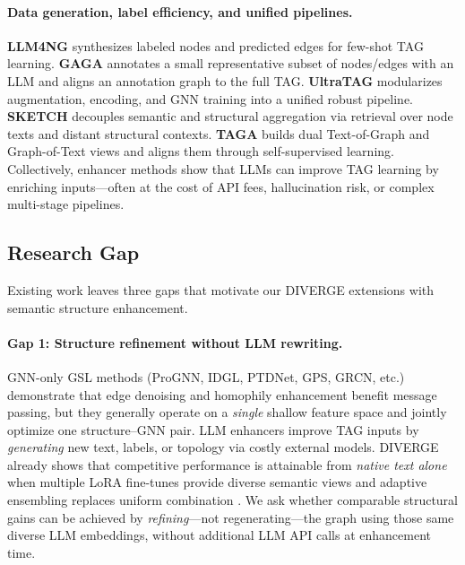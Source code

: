 \documentclass{article}
\begin{document}
\paragraph{Data generation, label efficiency, and unified pipelines.}
\textbf{LLM4NG} \citep{Yu2025NodeGenerationTAG} synthesizes labeled nodes and predicted
edges for few-shot TAG learning. \textbf{GAGA} \citep{hu2025gaga} annotates a small
representative subset of nodes/edges with an LLM and aligns an annotation graph to the
full TAG. \textbf{UltraTAG} \citep{yu2025ultratag} modularizes augmentation, encoding,
and GNN training into a unified robust pipeline. \textbf{SKETCH} \citep{zhou-etal-2025sketch}
decouples semantic and structural aggregation via retrieval over node texts and distant
structural contexts. \textbf{TAGA} \citep{zhang2025taga} builds dual Text-of-Graph and
Graph-of-Text views and aligns them through self-supervised learning. Collectively,
enhancer methods show that LLMs can improve TAG learning by enriching inputs---often
at the cost of API fees, hallucination risk, or complex multi-stage pipelines.


\subsection{Research Gap}
\label{sec:research-gap}

Existing work leaves three gaps that motivate our DIVERGE extensions with semantic
structure enhancement.

\paragraph{Gap 1: Structure refinement without LLM rewriting.}
GNN-only GSL methods (ProGNN, IDGL, PTDNet, GPS, GRCN, etc.) demonstrate that edge
denoising and homophily enhancement benefit message passing, but they generally operate
on a \emph{single} shallow feature space and jointly optimize one structure--GNN pair.
LLM enhancers improve TAG inputs by \emph{generating} new text, labels, or topology
via costly external models. DIVERGE already shows that competitive performance is
attainable from \emph{native text alone} when multiple LoRA fine-tunes provide diverse
semantic views and adaptive ensembling replaces uniform combination
\citep{he2024harnessing}. We ask whether comparable structural gains can be achieved
by \emph{refining}---not regenerating---the graph using those same diverse LLM
embeddings, without additional LLM API calls at enhancement time.
\end{document}
